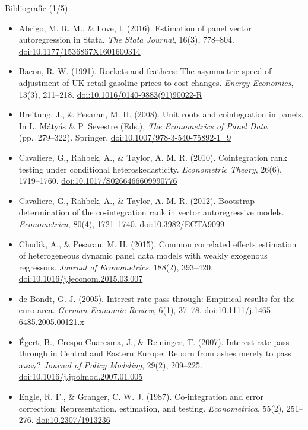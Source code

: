 \begin{frame}{Bibliografie (1/5)}
\itemsize{\tiny}
\begin{itemize}
    \item Abrigo, M. R. M., \& Love, I. (2016). Estimation of panel vector autoregression in Stata. \textit{The Stata Journal}, 16(3), 778--804. \href{https://doi.org/10.1177/1536867X1601600314}{doi:10.1177/1536867X1601600314}
    \item Bacon, R. W. (1991). Rockets and feathers: The asymmetric speed of adjustment of UK retail gasoline prices to cost changes. \textit{Energy Economics}, 13(3), 211--218. \href{https://doi.org/10.1016/0140-9883(91)90022-R}{doi:10.1016/0140-9883(91)90022-R}
    \item Breitung, J., \& Pesaran, M. H. (2008). Unit roots and cointegration in panels. In L. Mátyás \& P. Sevestre (Eds.), \textit{The Econometrics of Panel Data} (pp.\ 279--322). Springer. \href{https://doi.org/10.1007/978-3-540-75892-1_9}{doi:10.1007/978-3-540-75892-1\_9}
    \item Cavaliere, G., Rahbek, A., \& Taylor, A. M. R. (2010). Cointegration rank testing under conditional heteroskedasticity. \textit{Econometric Theory}, 26(6), 1719--1760. \href{https://doi.org/10.1017/S0266466609990776}{doi:10.1017/S0266466609990776}
    \item Cavaliere, G., Rahbek, A., \& Taylor, A. M. R. (2012). Bootstrap determination of the co-integration rank in vector autoregressive models. \textit{Econometrica}, 80(4), 1721--1740. \href{https://doi.org/10.3982/ECTA9099}{doi:10.3982/ECTA9099}
    \item Chudik, A., \& Pesaran, M. H. (2015). Common correlated effects estimation of heterogeneous dynamic panel data models with weakly exogenous regressors. \textit{Journal of Econometrics}, 188(2), 393--420. \href{https://doi.org/10.1016/j.jeconom.2015.03.007}{doi:10.1016/j.jeconom.2015.03.007}
    \item de Bondt, G. J. (2005). Interest rate pass-through: Empirical results for the euro area. \textit{German Economic Review}, 6(1), 37--78. \href{https://doi.org/10.1111/j.1465-6485.2005.00121.x}{doi:10.1111/j.1465-6485.2005.00121.x}
    \item Égert, B., Crespo-Cuaresma, J., \& Reininger, T. (2007). Interest rate pass-through in Central and Eastern Europe: Reborn from ashes merely to pass away? \textit{Journal of Policy Modeling}, 29(2), 209--225. \href{https://doi.org/10.1016/j.jpolmod.2007.01.005}{doi:10.1016/j.jpolmod.2007.01.005}
    \item Engle, R. F., \& Granger, C. W. J. (1987). Co-integration and error correction: Representation, estimation, and testing. \textit{Econometrica}, 55(2), 251--276. \href{https://doi.org/10.2307/1913236}{doi:10.2307/1913236}

\end{itemize}
\end{frame}
